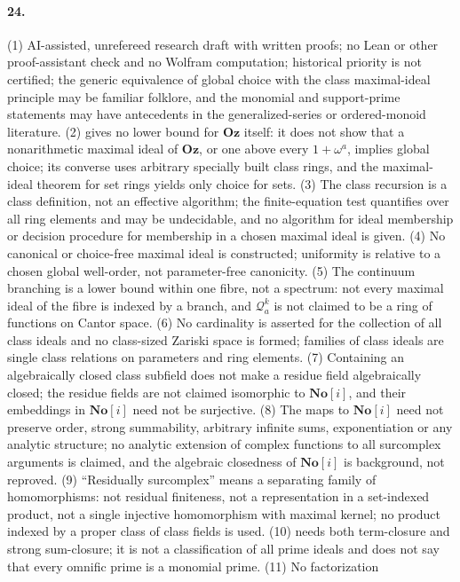 \documentclass[11pt,letterpaper]{article}
\numberwithin{equation}{section}
\theoremstyle{definition}
\theoremstyle{remark}
\theoremstyle{plain}
\newcommand{\No}{\mathbf{No}}
\newcommand{\Oz}{\mathbf{Oz}}
\newcommand{\SC}{\No[i]}
\newcommand{\Qa}{\mathcal Q}         %
\begin{document}
\paragraph{24.} (1) AI-assisted, unrefereed research draft with written proofs; no Lean or other proof-assistant check and no Wolfram computation;
historical priority is not certified; the generic equivalence of global choice with the class maximal-ideal principle may be familiar folklore, and the
monomial and support-prime statements may have antecedents in the generalized-series or ordered-monoid literature. (2) 
gives no lower bound for $\Oz$ itself: it does not show that a nonarithmetic maximal ideal of $\Oz$, or one above every $1+\omega^a$, implies global
choice; its converse uses arbitrary specially built class rings, and the maximal-ideal theorem for set rings yields only choice for sets. (3) The class
recursion is a class definition, not an effective algorithm; the finite-equation test quantifies over all ring elements and may be undecidable, and no
algorithm for ideal membership or decision procedure for membership in a chosen maximal ideal is given. (4) No canonical or choice-free maximal ideal is
constructed; uniformity is relative to a chosen global well-order, not parameter-free canonicity. (5) The continuum branching is a lower bound within one
fibre, not a spectrum: not every maximal ideal of the fibre is indexed by a branch, and $\Qa^k_a$ is not claimed to be a ring of functions on Cantor
space. (6) No cardinality is asserted for the collection of all class ideals and no class-sized Zariski space is formed; families of class ideals are
single class relations on parameters and ring elements. (7) Containing an algebraically closed class subfield does not make a residue field
algebraically closed; the residue fields are not claimed isomorphic to $\SC$, and their embeddings in $\SC$ need not be surjective. (8) The maps to
$\SC$ need not preserve order, strong summability, arbitrary infinite sums, exponentiation or any analytic structure; no analytic extension of complex
functions to all surcomplex arguments is claimed, and the algebraic closedness of $\SC$ is background, not reproved. (9) ``Residually surcomplex'' means
a separating family of homomorphisms: not residual finiteness, not a representation in a set-indexed product, not a single injective homomorphism with
maximal kernel; no product indexed by a proper class of class fields is used. (10)  needs both term-closure and strong
sum-closure; it is not a classification of all prime ideals and does not say that every omnific prime is a monomial prime. (11) No factorization
\end{document}
